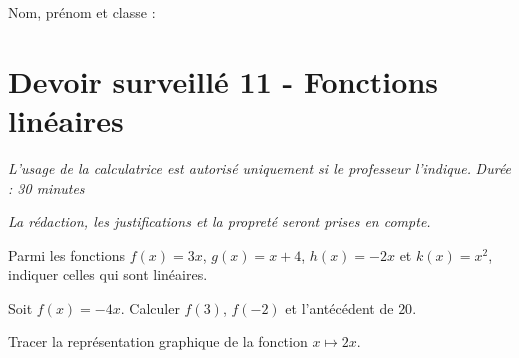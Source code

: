 \documentclass[a4paper,10pt]{report}
\begin{document}
\pagestyle{empty}
\noindent Nom, prénom et classe : \dotfill

\section*{Devoir surveillé 11 - Fonctions linéaires}

\noindent \textit{L'usage de la calculatrice est autorisé uniquement si le professeur l'indique.} \hfill \textit{Durée : 30 minutes}

\medskip
\noindent \textit{La rédaction, les justifications et la propreté seront prises en compte.}


\begin{ex}[Reconnaître]
Parmi les fonctions $f(x)=3x$, $g(x)=x+4$, $h(x)=-2x$ et $k(x)=x^2$, indiquer celles qui sont linéaires.
\medskip\noindent\grandscarreaux{\linewidth}{3cm}
\end{ex}
\begin{ex}[Calculer]
Soit $f(x)=-4x$. Calculer $f(3)$, $f(-2)$ et l'antécédent de $20$.
\medskip\noindent\grandscarreaux{\linewidth}{4cm}
\end{ex}
\begin{ex}[Représenter]
Tracer la représentation graphique de la fonction $x\mapsto 2x$.
\medskip\noindent\grandscarreaux{\linewidth}{7cm}
\end{ex}
\end{document}
